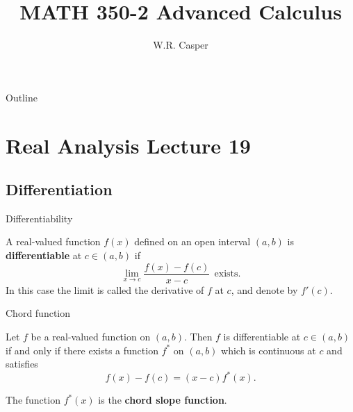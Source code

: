 \documentclass{beamer}
\title{MATH 350-2 Advanced Calculus}
\subtitle
{} %
\author[W.R. Casper] %
{W.R. Casper}
\institute[California State University Fullerton] %
{
  Department of Mathematics\\
  California State University Fullerton}
\begin{document}
\begin{frame}
  \titlepage
\end{frame}

\begin{frame}{Outline}
  \tableofcontents
\end{frame}



\section{Real Analysis Lecture 19}

\subsection{Differentiation}

\begin{frame}{Differentiability}
\begin{defn}
A real-valued function $f(x)$ defined on an open interval $(a,b)$ is \textbf{differentiable} at $c\in (a,b)$ if
$$\lim_{x\rightarrow c}\frac{f(x)-f(c)}{x-c}\ \ \text{exists}.$$
In this case the limit is called the derivative of $f$ at $c$, and denote by $f'(c)$.
\end{defn}
\end{frame}

\begin{frame}{Chord function}
\begin{thm}
Let $f$ be a real-valued function on $(a,b)$.  Then $f$ is differentiable at $c\in (a,b)$ if and only if there exists a function $f^*$ on $(a,b)$ which is continuous at $c$ and satisfies
$$f(x)-f(c) = (x-c)f^*(x).$$
\end{thm}
\pause
The function $f^*(x)$ is the \textbf{chord slope function}.
\end{frame}
\end{document}
